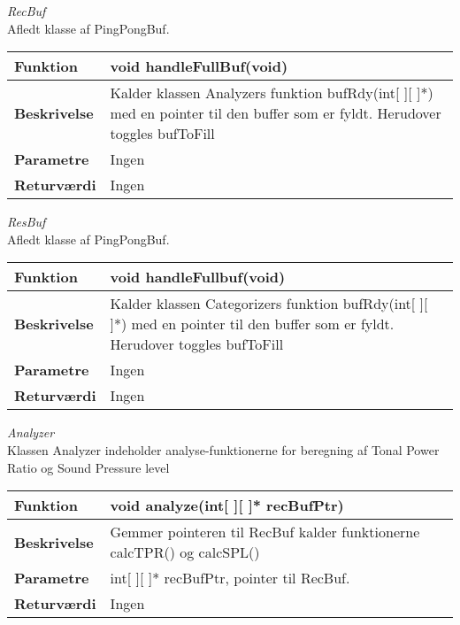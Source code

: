 \textit{RecBuf} \\
Afledt klasse af PingPongBuf. \\

\begin{center}
    \begin{tabular}{ | l | p{10cm} |}
    \hline
    \textbf{Funktion}	 	& void handleFullBuf(void)								\\ \hline
    \textbf{Beskrivelse} 	& Kalder klassen Analyzers funktion bufRdy(int[ ][ ]*) med en pointer til den buffer som er fyldt. Herudover toggles bufToFill																	\\ \hline
    \textbf{Parametre}		& Ingen		 											\\ \hline
    \textbf{Returværdi} 	& Ingen													\\ \hline
    \end{tabular}
\end{center}

\textit{ResBuf} \\
Afledt klasse af PingPongBuf. 

\begin{center}
    \begin{tabular}{ | l | p{10cm} |}
    \hline
    \textbf{Funktion}	 	& void handleFullbuf(void)											\\ \hline
    \textbf{Beskrivelse} 	& Kalder klassen Categorizers funktion bufRdy(int[ ][ ]*) med en pointer til den buffer som er fyldt. Herudover toggles bufToFill					    \\ \hline
    \textbf{Parametre}		& Ingen						 					\\ \hline
    \textbf{Returværdi} 	& Ingen									\\ \hline
    \end{tabular}
\end{center}

\textit{Analyzer} \\
Klassen Analyzer indeholder analyse-funktionerne for beregning af Tonal Power Ratio og Sound Pressure level

\begin{center}
    \begin{tabular}{ | l | p{10cm} |}
    \hline
    \textbf{Funktion}	 	& void analyze(int[ ][ ]* recBufPtr)									\\ \hline
    \textbf{Beskrivelse} 	& Gemmer pointeren til RecBuf kalder funktionerne calcTPR() og calcSPL()						\\ \hline
    \textbf{Parametre}		& int[ ][ ]* recBufPtr, pointer til RecBuf.							 					    \\ \hline
    \textbf{Returværdi} 	& Ingen														     \\ \hline
    \end{tabular}
\end{center}

